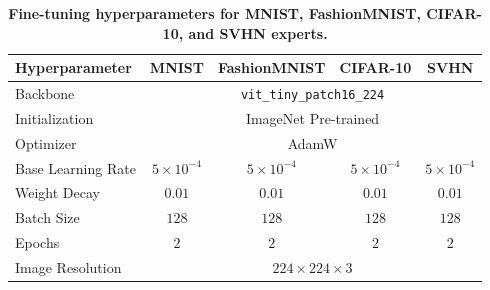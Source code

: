 \documentclass{article}
\theoremstyle{plain}
\theoremstyle{definition}
\theoremstyle{remark}
\begin{document}
\begin{table}[H]
\centering
\caption{\textbf{Fine-tuning hyperparameters for MNIST, FashionMNIST, CIFAR-10, and SVHN experts.}}
\label{tab:expert_hyperparameters}
\vskip 0.15in
\begin{tabular}{lcccc}
\toprule
\textbf{Hyperparameter} & \textbf{MNIST} & \textbf{FashionMNIST} & \textbf{CIFAR-10} & \textbf{SVHN} \\
\midrule
Backbone & \multicolumn{4}{c}{\texttt{vit\_tiny\_patch16\_224}} \\
Initialization & \multicolumn{4}{c}{ImageNet Pre-trained} \\
Optimizer & \multicolumn{4}{c}{AdamW} \\
Base Learning Rate & $5\times 10^{-4}$ & $5\times 10^{-4}$ & $5\times 10^{-4}$ & $5\times 10^{-4}$ \\
Weight Decay & $0.01$ & $0.01$ & $0.01$ & $0.01$ \\
Batch Size & $128$ & $128$ & $128$ & $128$ \\
Epochs & $2$ & $2$ & $2$ & $2$ \\
Image Resolution & \multicolumn{4}{c}{$224 \times 224 \times 3$} \\
\bottomrule
\end{tabular}
\end{table}
\end{document}
